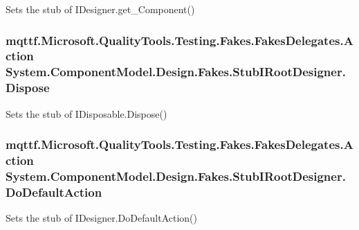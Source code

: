 Sets the stub of I\-Designer.\-get\-\_\-\-Component()

\hypertarget{class_system_1_1_component_model_1_1_design_1_1_fakes_1_1_stub_i_root_designer_adf48568d7b8c29d6cab3ad5554011afc}{
\subsubsection[{Dispose}]{\setlength{\rightskip}{0pt plus 5cm}mqttf.\-Microsoft.\-Quality\-Tools.\-Testing.\-Fakes.\-Fakes\-Delegates.\-Action System.\-Component\-Model.\-Design.\-Fakes.\-Stub\-I\-Root\-Designer.\-Dispose}}\label{class_system_1_1_component_model_1_1_design_1_1_fakes_1_1_stub_i_root_designer_adf48568d7b8c29d6cab3ad5554011afc}


Sets the stub of I\-Disposable.\-Dispose()

\hypertarget{class_system_1_1_component_model_1_1_design_1_1_fakes_1_1_stub_i_root_designer_aefa690667d69fd2b29d478061278787a}{
\subsubsection[{Do\-Default\-Action}]{\setlength{\rightskip}{0pt plus 5cm}mqttf.\-Microsoft.\-Quality\-Tools.\-Testing.\-Fakes.\-Fakes\-Delegates.\-Action System.\-Component\-Model.\-Design.\-Fakes.\-Stub\-I\-Root\-Designer.\-Do\-Default\-Action}}\label{class_system_1_1_component_model_1_1_design_1_1_fakes_1_1_stub_i_root_designer_aefa690667d69fd2b29d478061278787a}


Sets the stub of I\-Designer.\-Do\-Default\-Action()

